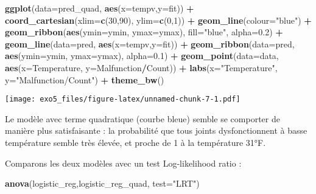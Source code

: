 \documentclass[]{article}
\newenvironment{Shaded}{\begin{snugshade}}{\end{snugshade}}
\newcommand{\DataTypeTok}[1]{\textcolor[rgb]{0.13,0.29,0.53}{#1}}
\newcommand{\DecValTok}[1]{\textcolor[rgb]{0.00,0.00,0.81}{#1}}
\newcommand{\FloatTok}[1]{\textcolor[rgb]{0.00,0.00,0.81}{#1}}
\newcommand{\KeywordTok}[1]{\textcolor[rgb]{0.13,0.29,0.53}{\textbf{#1}}}
\newcommand{\NormalTok}[1]{#1}
\newcommand{\OperatorTok}[1]{\textcolor[rgb]{0.81,0.36,0.00}{\textbf{#1}}}
\newcommand{\StringTok}[1]{\textcolor[rgb]{0.31,0.60,0.02}{#1}}
\begin{document}
\begin{Shaded}
\begin{Highlighting}[]
\KeywordTok{ggplot}\NormalTok{(}\DataTypeTok{data=}\NormalTok{pred_quad, }\KeywordTok{aes}\NormalTok{(}\DataTypeTok{x=}\NormalTok{tempv,}\DataTypeTok{y=}\NormalTok{fit)) }\OperatorTok{+}
\StringTok{  }\KeywordTok{coord_cartesian}\NormalTok{(}\DataTypeTok{xlim=}\KeywordTok{c}\NormalTok{(}\DecValTok{30}\NormalTok{,}\DecValTok{90}\NormalTok{), }\DataTypeTok{ylim=}\KeywordTok{c}\NormalTok{(}\DecValTok{0}\NormalTok{,}\DecValTok{1}\NormalTok{)) }\OperatorTok{+}
\StringTok{  }\KeywordTok{geom_line}\NormalTok{(}\DataTypeTok{colour=}\StringTok{"blue"}\NormalTok{) }\OperatorTok{+}
\StringTok{  }\KeywordTok{geom_ribbon}\NormalTok{(}\KeywordTok{aes}\NormalTok{(}\DataTypeTok{ymin=}\NormalTok{ymin, }\DataTypeTok{ymax=}\NormalTok{ymax), }\DataTypeTok{fill=}\StringTok{"blue"}\NormalTok{, }\DataTypeTok{alpha=}\FloatTok{0.2}\NormalTok{) }\OperatorTok{+}
\StringTok{  }\KeywordTok{geom_line}\NormalTok{(}\DataTypeTok{data=}\NormalTok{pred, }\KeywordTok{aes}\NormalTok{(}\DataTypeTok{x=}\NormalTok{tempv,}\DataTypeTok{y=}\NormalTok{fit)) }\OperatorTok{+}
\StringTok{  }\KeywordTok{geom_ribbon}\NormalTok{(}\DataTypeTok{data=}\NormalTok{pred, }\KeywordTok{aes}\NormalTok{(}\DataTypeTok{ymin=}\NormalTok{ymin, }\DataTypeTok{ymax=}\NormalTok{ymax), }\DataTypeTok{alpha=}\FloatTok{0.1}\NormalTok{) }\OperatorTok{+}
\StringTok{  }\KeywordTok{geom_point}\NormalTok{(}\DataTypeTok{data=}\NormalTok{data, }\KeywordTok{aes}\NormalTok{(}\DataTypeTok{x=}\NormalTok{Temperature, }\DataTypeTok{y=}\NormalTok{Malfunction}\OperatorTok{/}\NormalTok{Count)) }\OperatorTok{+}
\StringTok{  }\KeywordTok{labs}\NormalTok{(}\DataTypeTok{x=}\StringTok{"Temperature"}\NormalTok{, }\DataTypeTok{y=}\StringTok{"Malfunction/Count"}\NormalTok{) }\OperatorTok{+}
\StringTok{  }\KeywordTok{theme_bw}\NormalTok{()}
\end{Highlighting}
\end{Shaded}

\texttt{[image: exo5\_files/figure-latex/unnamed-chunk-7-1.pdf]}

Le modèle avec terme quadratique (courbe bleue) semble se comporter de
manière plus satisfaisante : la probabilité que tous joints
dysfonctionnent à basse température semble très élevée, et proche de 1 à
la température 31°F.

Comparons les deux modèles avec un test Log-likelihood ratio :

\begin{Shaded}
\begin{Highlighting}[]
\KeywordTok{anova}\NormalTok{(logistic_reg,logistic_reg_quad, }\DataTypeTok{test=}\StringTok{"LRT"}\NormalTok{)}
\end{Highlighting}
\end{Shaded}
\end{document}
